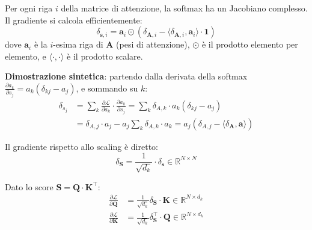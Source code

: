 \documentclass[12pt,a4paper]{article}
\begin{document}
\begin{formulabox}
Per ogni riga $i$ della matrice di attenzione, la softmax ha un Jacobiano complesso. Il gradiente si calcola efficientemente:
\[
    \delta_{\mathbf{s},i} = \mathbf{a}_i \odot \left(\delta_{\mathbf{A},i} - \langle \delta_{\mathbf{A},i}, \mathbf{a}_i \rangle \cdot \mathbf{1}\right)
\]
dove $\mathbf{a}_i$ \`e la $i$-esima riga di $\mathbf{A}$ (pesi di attenzione), $\odot$ \`e il prodotto elemento per elemento, e $\langle \cdot, \cdot \rangle$ \`e il prodotto scalare.

\textbf{Dimostrazione sintetica}: partendo dalla derivata della softmax $\frac{\partial a_k}{\partial s_j} = a_k(\delta_{kj} - a_j)$, e sommando su $k$:
\begin{align*}
    \delta_{s_j} &= \sum_k \frac{\partial \mathcal{L}}{\partial a_k} \cdot \frac{\partial a_k}{\partial s_j} = \sum_k \delta_{A,k} \cdot a_k(\delta_{kj} - a_j) \\
    &= \delta_{A,j} \cdot a_j - a_j \sum_k \delta_{A,k} \cdot a_k = a_j \left(\delta_{A,j} - \langle \delta_{\mathbf{A}}, \mathbf{a} \rangle\right)
\end{align*}
\end{formulabox}

\begin{formulabox}
Il gradiente rispetto allo scaling \`e diretto:
\[
    \delta_{\mathbf{S}} = \frac{1}{\sqrt{d_k}} \cdot \delta_{\mathbf{s}} \in \mathbb{R}^{N \times N}
\]
\end{formulabox}

\begin{formulabox}[B5.5 --- Gradienti di Q e K]
Dato lo score $\mathbf{S} = \mathbf{Q} \cdot \mathbf{K}^\top$:
\begin{align*}
    \frac{\partial \mathcal{L}}{\partial \mathbf{Q}} &= \frac{1}{\sqrt{d_k}} \delta_{\mathbf{S}} \cdot \mathbf{K} \in \mathbb{R}^{N \times d_k} \\[4pt]
    \frac{\partial \mathcal{L}}{\partial \mathbf{K}} &= \frac{1}{\sqrt{d_k}} \delta_{\mathbf{S}}^\top \cdot \mathbf{Q} \in \mathbb{R}^{N \times d_k}
\end{align*}
\end{formulabox}
\end{document}
